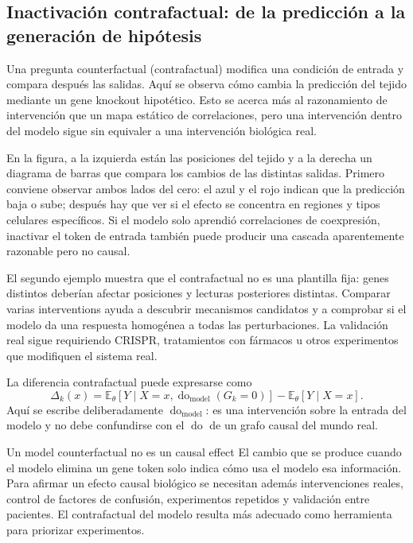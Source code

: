 \subsection{Inactivación contrafactual: de la predicción a la generación de hipótesis}

Una pregunta counterfactual (contrafactual) modifica una condición de entrada y compara después las salidas. Aquí se observa cómo cambia la predicción del tejido mediante un gene knockout hipotético. Esto se acerca más al razonamiento de intervención que un mapa estático de correlaciones, pero una intervención dentro del modelo sigue sin equivaler a una intervención biológica real.


En la figura, a la izquierda están las posiciones del tejido y a la derecha un diagrama de barras que compara los cambios de las distintas salidas. Primero conviene observar ambos lados del cero: el azul y el rojo indican que la predicción baja o sube; después hay que ver si el efecto se concentra en regiones y tipos celulares específicos. Si el modelo solo aprendió correlaciones de coexpresión, inactivar el token de entrada también puede producir una cascada aparentemente razonable pero no causal.


El segundo ejemplo muestra que el contrafactual no es una plantilla fija: genes distintos deberían afectar posiciones y lecturas posteriores distintas. Comparar varias interventions ayuda a descubrir mecanismos candidatos y a comprobar si el modelo da una respuesta homogénea a todas las perturbaciones. La validación real sigue requiriendo CRISPR, tratamientos con fármacos u otros experimentos que modifiquen el sistema real.

La diferencia contrafactual puede expresarse como
\[
\Delta_k(x)=
\mathbb{E}_\theta[Y\mid X=x,\operatorname{do}_{\text{model}}(G_k=0)]
-\mathbb{E}_\theta[Y\mid X=x].
\]
Aquí se escribe deliberadamente $\operatorname{do}_{\text{model}}$: es una intervención sobre la entrada del modelo y no debe confundirse con el $\operatorname{do}$ de un grafo causal del mundo real.

\begin{warningbox}{Un model counterfactual no es un causal effect}
El cambio que se produce cuando el modelo elimina un gene token solo indica cómo usa el modelo esa información. Para afirmar un efecto causal biológico se necesitan además intervenciones reales, control de factores de confusión, experimentos repetidos y validación entre pacientes. El contrafactual del modelo resulta más adecuado como herramienta para priorizar experimentos.
\end{warningbox}

